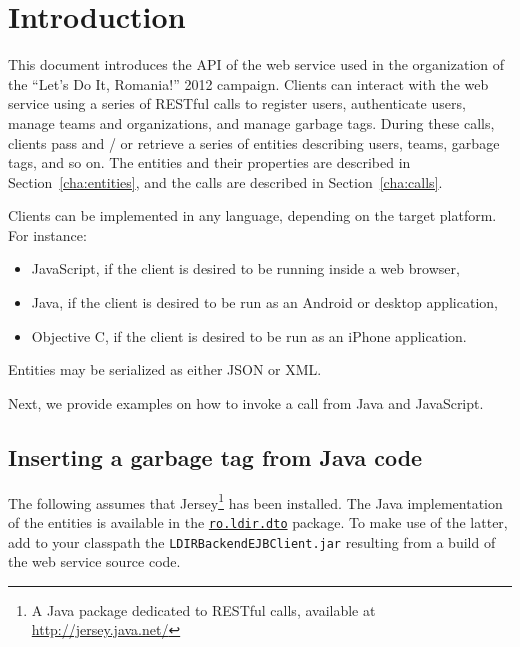 \chapter{Introduction}

This document introduces the API of the web service used in the organization of
the ``Let's Do It, Romania!'' 2012 campaign. Clients can interact with the web
service using a series of RESTful calls to register users, authenticate users,
manage teams and organizations, and manage garbage tags. During these calls,
clients pass and / or retrieve a series of entities describing users, teams,
garbage tags, and so on. The entities and their properties are described in
Section~\ref{cha:entities}, and the calls are described in
Section~\ref{cha:calls}. 

Clients can be implemented in any language, depending on the target platform.
For instance:
\begin{itemize}
  \item JavaScript, if the client is desired to be running inside a web
    browser,
  \item Java, if the client is desired to be run as an Android or desktop
    application,
  \item Objective C, if the client is desired to be run as an iPhone
    application.
\end{itemize}

Entities may be serialized as either JSON or XML.

Next, we provide examples on how to invoke a call from Java and JavaScript.

\section{Inserting a garbage tag from Java code}

The following assumes that Jersey\footnote{A Java package dedicated to RESTful
calls, available at \url{http://jersey.java.net/}} has been installed. The Java
implementation of the entities is available in the
\href{http://code.google.com/p/letsdoitromania2011/source/browse/#svn\%2Ftrunk\%2FWeb\%2FService\%2FLDIRBackendEJBClient\%2FejbModule\%2Fro\%2Fldir\%2Fdto}{\texttt{ro.ldir.dto}}
package. To make use of the latter, add to your classpath the
\texttt{LDIRBackendEJBClient.jar} resulting from a build of the web service
source code.

